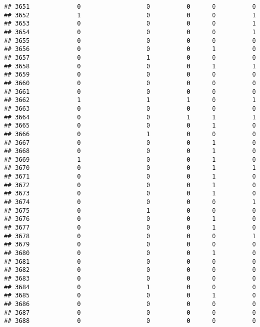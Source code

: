 \documentclass[
]{article}
\begin{document}
\begin{verbatim}
## 3651             0                  0          0      0          0
## 3652             1                  0          0      0          1
## 3653             0                  0          0      0          1
## 3654             0                  0          0      0          1
## 3655             0                  0          0      0          0
## 3656             0                  0          0      1          0
## 3657             0                  1          0      0          0
## 3658             0                  0          0      1          1
## 3659             0                  0          0      0          0
## 3660             0                  0          0      0          0
## 3661             0                  0          0      0          0
## 3662             1                  1          1      0          1
## 3663             0                  0          0      0          0
## 3664             0                  0          1      1          1
## 3665             0                  0          0      1          0
## 3666             0                  1          0      0          0
## 3667             0                  0          0      1          0
## 3668             0                  0          0      1          0
## 3669             1                  0          0      1          0
## 3670             0                  0          0      1          1
## 3671             0                  0          0      1          0
## 3672             0                  0          0      1          0
## 3673             0                  0          0      1          0
## 3674             0                  0          0      0          1
## 3675             0                  1          0      0          0
## 3676             0                  0          0      1          0
## 3677             0                  0          0      1          0
## 3678             0                  0          0      0          1
## 3679             0                  0          0      0          0
## 3680             0                  0          0      1          0
## 3681             0                  0          0      0          0
## 3682             0                  0          0      0          0
## 3683             0                  0          0      0          0
## 3684             0                  1          0      0          0
## 3685             0                  0          0      1          0
## 3686             0                  0          0      0          0
## 3687             0                  0          0      0          0
## 3688             0                  0          0      0          0

\end{verbatim}
\end{document}

